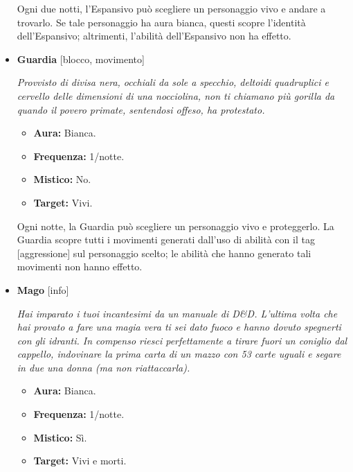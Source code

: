 \documentclass[a4paper,10pt]{article}
\begin{document}
\begin{itemize}
            Ogni due notti, l'Espansivo può scegliere un personaggio vivo e andare a trovarlo. Se tale personaggio ha aura bianca, questi scopre l'identità dell'Espansivo; altrimenti, l'abilità dell'Espansivo non ha effetto.

      \item \textbf{Guardia} [blocco, movimento]

            \emph{Provvisto di divisa nera, occhiali da sole a specchio, deltoidi quadruplici e cervello delle dimensioni di una nocciolina, non ti chiamano più gorilla da quando il povero primate, sentendosi offeso, ha protestato.}

            \begin{multicols}{2}
                  \begin{itemize}
                        \item \textbf{Aura:} Bianca.
                        \item \textbf{Frequenza:} 1/notte.
                        \item \textbf{Mistico:} No.
                        \item \textbf{Target:} Vivi.
                  \end{itemize}
            \end{multicols}

            Ogni notte, la Guardia può scegliere un personaggio vivo e proteggerlo. La Guardia scopre tutti i movimenti generati dall'uso di abilità con il tag [aggressione] sul personaggio scelto; le abilità che hanno generato tali movimenti non hanno effetto.

      \item \textbf{Mago} [info]

            \emph{Hai imparato i tuoi incantesimi da un manuale di D\&D. L'ultima volta che hai provato a fare una magia vera ti sei dato fuoco e hanno dovuto spegnerti con gli idranti. In compenso riesci perfettamente a tirare fuori un coniglio dal cappello, indovinare la prima carta di un mazzo con 53 carte uguali e segare in due una donna (ma non riattaccarla).}

            \begin{multicols}{2}
                  \begin{itemize}
                        \item \textbf{Aura:} Bianca.
                        \item \textbf{Frequenza:} 1/notte.
                        \item \textbf{Mistico:} Sì.
                        \item \textbf{Target:} Vivi e morti.
                  \end{itemize}
            \end{multicols}


\end{itemize}
\end{document}
